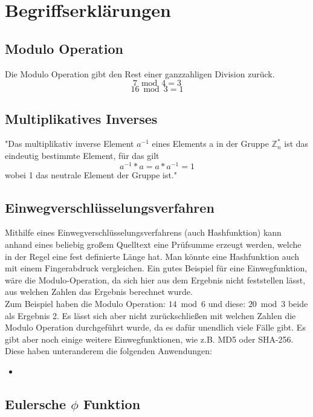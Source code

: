 \documentclass[12pt,a4paper]{scrartcl}
\begin{document}
\section{Begriffserklärungen}
	\subsection{Modulo Operation} %
	Die Modulo Operation gibt den Rest einer ganzzahligen Division zurück.
	$$ {7 \bmod 4 = 3} $$
	$$ {16 \bmod 3 = 1} $$
	
	\subsection{Multiplikatives Inverses}
	"Das multiplikativ inverse Element $a^{-1}$ eines Elements a in der Gruppe $\mathbb{Z}_n ^*$ ist das eindeutig bestimmte Element, für das gilt $${a^{-1} * a  =  a * a^{-1}  =  1}$$ wobei 1 das neutrale Element der Gruppe ist." \cite{hwlang}
	
	
	\subsection{Einwegverschlüsselungsverfahren}
	Mithilfe eines Einwegverschlüsselungsverfahrens (auch Hashfunktion) kann anhand eines beliebig großem Quelltext eine Prüfsumme erzeugt werden, welche in der Regel eine fest definierte Länge hat. Man könnte eine Hashfunktion auch mit einem Fingerabdruck vergleichen. Ein gutes Beispiel für eine Einwegfunktion, wäre die Modulo-Operation, da sich hier aus dem Ergebnis nicht feststellen lässt, aus welchen Zahlen das Ergebnis berechnet wurde. \\
	Zum Beispiel haben die Modulo Operation: ${14 \bmod 6}$  und diese: ${20 \bmod 3}$ beide als Ergebnis 2. Es lässt sich aber nicht zurückschließen mit welchen Zahlen die Modulo Operation durchgeführt wurde, da es dafür unendlich viele Fälle gibt. Es gibt aber noch einige weitere Einwegfunktionen, wie z.B. MD5 oder SHA-256. Diese haben unteranderem die folgenden Anwendungen:
	
	\begin{itemize}
	\item
	
	\end{itemize}
	
	\label{ch:einweg}
	\subsection{Eulersche $\phi$ Funktion}
	\label{cha:phi}
	
\end{document}
